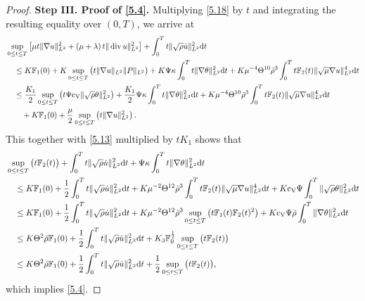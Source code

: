 \documentclass[11pt]{article}
\DeclareMathOperator{\divv}{div}
\newcommand{\na}{\nabla}
\begin{document}
\begin{proof}
{\bf Step III. Proof of \eqref{5.4}.}
Multiplying \eqref{5.18} by $t$ and integrating the resulting equality over $(0,T)$, we arrive at
\begin{align*}
& \sup_{0 \leq t \leq T} \left[\mu t \|\nabla u\|_{L^2}^2 + \left(\mu + \lambda \right) t\|\divv u\|_{L^2}^2 \right] + \int^T_0 t \|\sqrt{\rho} \dot{u}\|_{L^2}^2 \mathrm{d} t\\
& \quad \leq K \mathbb{F}_1 (0) + K \sup_{0 \leq t \leq T}\big(t \|\nabla u\|_{L^2} \|P\|_{L^2}\big)+ K \Psi \kappa \int^T_0 t \|\nabla \theta \|_{L^2}^2 \mathrm{d} t + K \mu^{-4} \Theta^{10} \bar{\rho}^3 \int^T_0 t \mathbb{F}_2 (t) \|\sqrt{\mu}\nabla u\|_{L^2}^4 \mathrm{d} t\\
& \quad \leq \frac{K_1}{2} \sup_{0 \leq t \leq T} \left(t \Psi {\rm c_V} \|\sqrt{\rho} \theta \|_{L^2}^2 \right) + \frac{K_1}{2} \Psi \kappa \int^T_0 t \|\nabla \theta \|_{L^2}^2 \mathrm{d} t + K \mu^{-4} \Theta^{10} \bar{\rho}^3 \int^T_0 t \mathbb{F}_2 (t) \|\sqrt{\mu}\nabla u\|_{L^2}^4 \mathrm{d} t\\
& \qquad + K \mathbb{F}_1 (0) + \frac{\mu}{2} \sup_{0 \leq t \leq T} \left(t \|\nabla u\|_{L^2}^2 \right).
\end{align*}
This together with \eqref{5.13} multiplied by $t K_1$ shows that
\begin{align*}
& \sup_{0 \leq t \leq T}\big(t \mathbb{F}_2 (t)\big)+ \int^T_0 t \|\sqrt{\rho} \dot{u}\|_{L^2}^2 \mathrm{d} t + \Psi \kappa \int^T_0 t \|\nabla \theta \|_{L^2}^2 \mathrm{d} t\\
& \quad \leq K \mathbb{F}_1 (0) +  \frac{1}{2} \int^T_0 t \|\sqrt{\rho} \dot{u}\|_{L^2}^2 \mathrm{d} t + K \mu^{-2} \Theta^{12} \bar{\rho}^3 \int^T_0 t \mathbb{F}_2 (t) \|\sqrt{\mu}\nabla u\|_{L^2}^4 \mathrm{d} t + K {\rm c_V} \Psi \int^T_0 \|\sqrt{\rho} \theta\|_{L^2}^2 {\rm d} t\\
& \quad \leq K \mathbb{F}_1 (0) + \frac{1}{2} \int^T_0 t \|\sqrt{\rho} \dot{u}\|_{L^2}^2 \mathrm{d} t + K \mu^{-2} \Theta^{12} \bar{\rho}^3 \sup_{0 \leq t \leq T}\big(t \mathbb{F}_1 (t) \mathbb{F}_2 (t)^2\big)+ K {\rm c_V} \Psi \bar{\rho} \int^T_0 \|\na \theta\|_{L^2}^2 {\rm d} t\\
& \quad \leq K \Theta^2 \bar{\rho} \mathbb{F}_1 (0) + \frac{1}{2} \int^T_0 t \|\sqrt{\rho} \dot{u}\|_{L^2}^2 \mathrm{d} t + K_3 \mathbb{F}_0^{\frac12} \sup_{0 \leq t \leq T}\big(t \mathbb{F}_2 (t)\big)\\
& \quad \leq K \Theta^2 \bar{\rho} \mathbb{F}_1 (0) + \frac{1}{2} \int^T_0 t \|\sqrt{\rho} \dot{u}\|_{L^2}^2 \mathrm{d} t + \frac{1}{2} \sup_{0 \leq t \leq T}\big(t \mathbb{F}_2 (t)\big),
\end{align*}
which implies \eqref{5.4}.


\end{proof}
\end{document}
